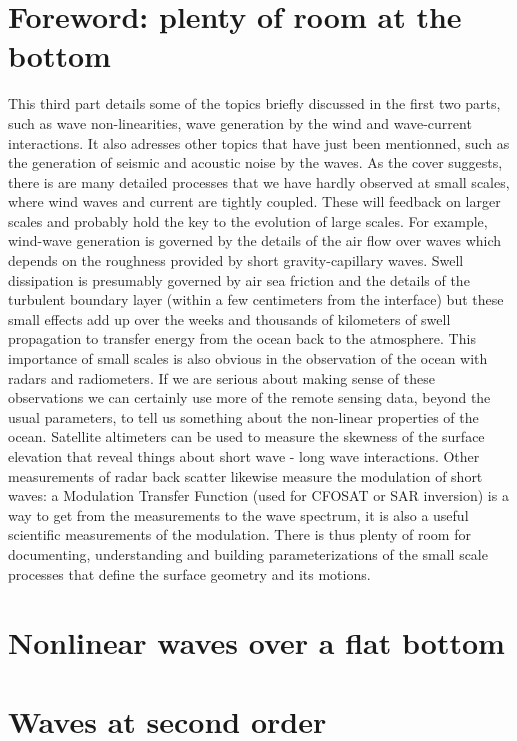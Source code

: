 \documentclass[a4paper]{book}  %
\begin{document}
\chapter*{Foreword: plenty of room at the bottom}\label{foreword2}
This third part details some of the topics briefly discussed in the first two parts, 
such as wave non-linearities, wave generation by the wind
and wave-current interactions. It also adresses other topics that have just been mentionned, such as the generation of 
seismic and acoustic noise by the waves. As the cover suggests, there is are many detailed processes that we have hardly observed at small scales, where wind waves and current are tightly coupled. These will feedback on larger scales and probably hold the key to the evolution of large scales. For example, wind-wave generation is governed by the details of the air flow over waves which depends on the roughness provided by short gravity-capillary waves. Swell dissipation is presumably governed by air sea friction  and the details of the turbulent boundary layer (within a few centimeters from the interface) but these small effects add up over the weeks and thousands of kilometers of swell propagation to transfer energy from the ocean back to the atmosphere. This importance of small scales is also obvious in the observation of the ocean with radars and radiometers. If we are serious about making sense of these observations we can certainly use more of the remote sensing data, beyond the usual parameters, to tell us something about the non-linear properties of the ocean. Satellite altimeters can be used to measure the skewness of the surface elevation that reveal things about short wave - long wave interactions. Other measurements of radar back scatter likewise measure the modulation of short waves: a Modulation Transfer Function (used for CFOSAT or SAR inversion) is a way to get from the measurements to the wave spectrum, it is also a useful scientific measurements of the modulation. There is thus plenty of room for documenting, understanding and building parameterizations of the small scale processes that define the surface geometry and its motions. 
\cleardoublepage
\chapter{Nonlinear waves over a flat bottom}\label{ch_nonlin}
 
\cleardoublepage
\chapter{Waves at second order}\label{chnl2}

\cleardoublepage
%
\end{document}
